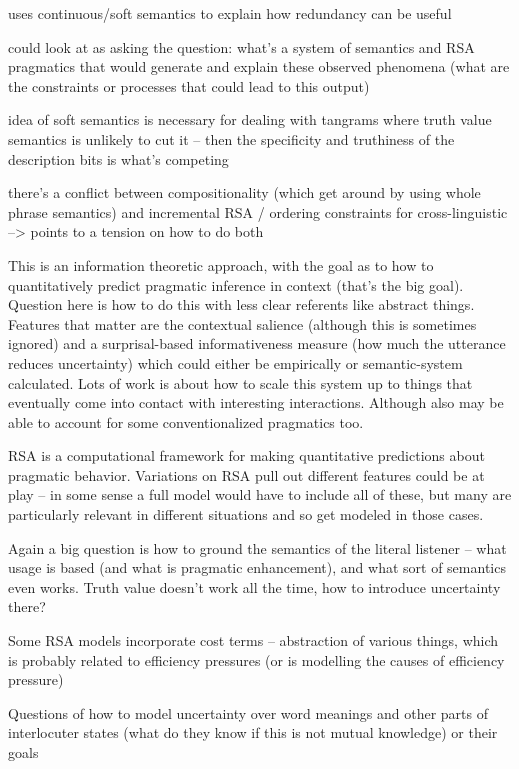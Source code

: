 \documentclass[]{article}
\begin{document}
\cite{degen20200406} uses continuous/soft semantics to explain how redundancy can be useful

could look at \cite{degen20200406} as asking the question: what's a system of semantics and RSA pragmatics that would generate and explain these observed phenomena (what are the constraints or processes that could lead to this output) 

idea of soft semantics is necessary for dealing with tangrams where truth value semantics is unlikely to cut it -- then the specificity and truthiness of the description bits is what's competing 

there's a conflict between compositionality (which \cite{degen20200406} get around by using whole phrase semantics) and incremental RSA / ordering constraints for cross-linguistic --> points to a tension on how to do both

\cite{frank2012a} This is an information theoretic approach, with the goal as to how to quantitatively predict pragmatic inference in context (that's the big goal). Question here is how to do this with less clear referents like abstract things. Features that matter are the contextual salience (although this is sometimes ignored) and a surprisal-based informativeness measure (how much the utterance reduces uncertainty) which could either be empirically or semantic-system calculated. Lots of work is about how to scale this system up to things that eventually come into contact with interesting interactions. Although also may be able to account for some conventionalized pragmatics too. 

\cite{goodman2016} RSA is a computational framework for making quantitative predictions about pragmatic behavior. Variations on RSA pull out different features could be at play -- in some sense a full model would have to include all of these, but many are particularly relevant in different situations and so get modeled in those cases. 

Again a big question is how to ground the semantics of the literal listener -- what usage is based (and what is pragmatic enhancement), and what sort of semantics even works. Truth value doesn't work all the time, how to introduce uncertainty there? 

Some RSA models incorporate cost terms -- abstraction of various things, which is probably related to efficiency pressures (or is modelling the causes of efficiency pressure) 

Questions of how to model uncertainty over word meanings and other parts of interlocuter states (what do they know if this is not mutual knowledge) or their goals
\end{document}
